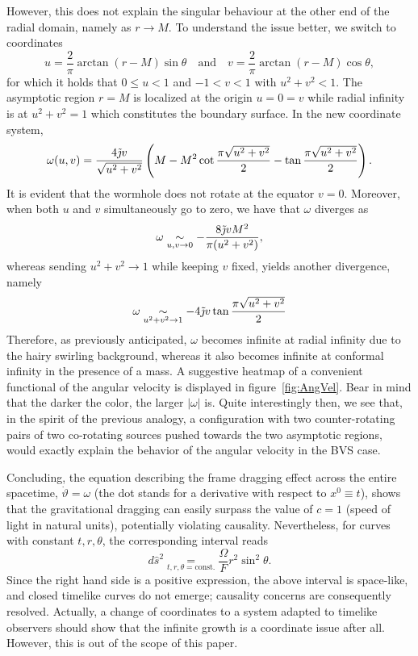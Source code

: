 \documentclass[aps,preprint,groupedaddress,nofootinbib,superscriptaddress,showkeys,showpacs,eqsecnum,amsmath,amssymb]{revtex4-1}
\begin{document}
However, this does not explain the singular behaviour at the other end of the radial domain, namely as $r\to M$. To understand the issue better, we switch to coordinates 
\begin{equation}
    u=\frac{2}{\pi}\arctan(r-M)\sin\theta\quad\text{and}\quad v=\frac{2}{\pi}\arctan(r-M)\cos\theta,\label{eq:UVcoords}
\end{equation}
for which it holds that $0\leq u < 1$ and $-1< v< 1$ with $u^2+v^2<1$. The asymptotic region $r=M$ is localized at the origin $u=0=v$ while radial infinity is at $u^2+v^2=1$ which constitutes the boundary surface. In the new coordinate system, 
\begin{equation}
    \omega(u,v) = \frac{4\Tilde{\jmath}v}{\sqrt{u^2+v^2}}\left( M - M^2 \cot \frac{\pi \sqrt{u^2+v^2}}{2} - \tan \frac{\pi \sqrt{u^2+v^2}}{2}\right).
\end{equation}
It is evident that the wormhole does not rotate at the equator $v=0$. Moreover, when both $u$ and $v$ simultaneously go to zero, we have that $\omega$ diverges as
\begin{equation}
    \omega \underset{u,v\to 0}{\sim} -\frac{8\Tilde{\jmath}vM^2}{\pi(u^2+v^2)},
\end{equation}
whereas sending $u^2+v^2\to 1$ while keeping $v$ fixed, yields another divergence, namely
\begin{equation}
    \omega \underset{u^2+v^2\to 1}{\sim} -{4\Tilde{\jmath}v}\tan \frac{\pi \sqrt{u^2+v^2}}{2}
\end{equation}
Therefore, as previously anticipated, $\omega$ becomes infinite at radial infinity due to the hairy swirling background, whereas it also becomes infinite at conformal infinity in the presence of a mass. A suggestive heatmap of a convenient functional of the angular velocity is displayed in figure~\ref{fig:AngVel}. Bear in mind that the darker the color, the larger $|\omega|$ is. Quite interestingly then, we see that, in the spirit of the previous analogy, a configuration with two counter-rotating pairs of two co-rotating sources pushed towards the two asymptotic regions, would exactly explain the behavior of the angular velocity in the BVS case.


Concluding, the equation describing the frame dragging effect across the entire spacetime, $\dot{\vartheta} = \omega$ (the dot stands for a derivative with respect to $x^0\equiv t$), shows that the gravitational dragging can easily surpass the value of $c=1$ (speed of light in natural units), potentially violating causality. Nevertheless, for curves with constant $t,r,\theta$, the corresponding interval reads
\begin{equation}
    d\hat{s}^2 \underset{t,r,\theta = \text{const.}}{=}\frac{\Omega}{F}r^2\sin^2\theta.
\end{equation}
Since the right hand side is a positive expression, the above interval is space-like, and closed timelike curves do not emerge; causality concerns are consequently resolved. Actually, a change of coordinates to a system adapted to timelike observers should show that the infinite growth is a coordinate issue after all. However, this is out of the scope of this paper. 
\end{document}
